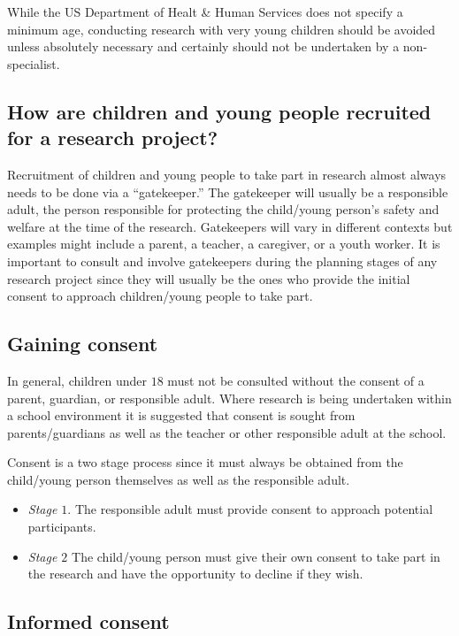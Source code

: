 While the US Department of Healt \& Human Services does not specify a minimum age, conducting research with very young children should be avoided unless absolutely necessary and certainly should not be undertaken by a non-specialist.

\subsection{How are children and young people recruited for a research project?}

Recruitment of children and young people to take part in research almost always needs to be done via a ``gatekeeper.'' The gatekeeper will usually be a responsible adult, \ie the person responsible for protecting the child/young person's safety and welfare at the time of the research. Gatekeepers will vary in different contexts but examples might include a parent, a teacher, a caregiver, or a youth worker. It is important to consult and involve gatekeepers during the planning stages of any research project since they will usually be the ones who provide the initial consent to approach children/young people to take part.

\subsection{Gaining consent}

In general, children under $ 18 $ must not be consulted without the consent of a parent, guardian, or responsible adult. Where research is being undertaken within a school environment it is suggested that consent is sought from parents/guardians as well as the teacher or other responsible adult at the school.

Consent is a two stage process since it must always be obtained from the child/young person themselves as well as the responsible adult.

\begin{itemize}
	\item \textit{Stage $ 1 $}. The responsible adult must provide consent to approach potential participants.

	\item \textit{Stage $ 2 $} The child/young person must give their own consent to take part in the research and have the opportunity to decline if they wish.
\end{itemize}

\subsection{Informed consent}

